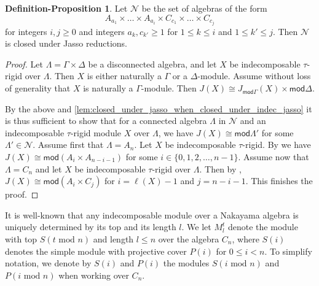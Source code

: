 \documentclass[11pt]{amsart}
\newcommand{\mods}{\mathsf{mod}}
\theoremstyle{definition}
\newtheorem{definitionproposition}[theorem]{Definition-Proposition}
\begin{document}
\begin{definitionproposition}
    
   Let $\mathcal{N}$ be the set of algebras of the form \[A_{a_1} \times \dots \times A_{a_i} \times C_{c_1} \times \dots \times C_{c_j}\] for integers $ i,j \geq 0$ and integers $a_k,c_{k'} \geq 1$ for $1 \leq k \leq i$ and $1 \leq k' \leq j$. Then $\mathcal{N}$ is closed under Jasso reductions.

\end{definitionproposition}

\begin{proof}
    Let $\Lambda = \Gamma \times \Delta$ be a disconnected algebra, and let $X$ be indecomposable $\tau$-rigid over $\Lambda$. Then $X$ is either naturally a $\Gamma$ or a $\Delta$-module. Assume without loss of generality that $X$ is naturally a $\Gamma$-module. Then $J(X) \cong J_{\mods \Gamma}(X) \times \mods \Delta$.

    By the above and \cref{lem:closed_under_jasso_when_closed_under_indec_jasso} it is thus sufficient to show that for a connected algebra $\Lambda$ in $\mathcal{N}$ and an indecomposable $\tau$-rigid module $X$ over $\Lambda$, we have $J(X) \cong \mods \Lambda'$ for some $\Lambda' \in \mathcal{N}$. Assume first that $\Lambda = A_n$. Let $X$ be indecomposable $\tau$-rigid. By \cite[Lem. 2]{MustafaObaid2013} we have $J(X) \cong \mods(A_{i} \times A_{n-i-1})$ for some $i \in \{0,1,2,\dots,n-1\}$. Assume now that $\Lambda = C_n$ and let $X$ be indecomposable $\tau$-rigid over $\Lambda$. Then by \cite[Prop 6.5]{Msapato2022}, $J(X) \cong \mods( A_i \times C_j)$ for $i = \ell(X)-1$ and $j = n-i-1$. This finishes the proof.
\end{proof}

It is well-known that any indecomposable module over a Nakayama algebra is uniquely determined by its top and its length $l$. We let $M^t_l$ denote the module with top $S(t \text{ mod } n)$ and length $l \leq n$ over the algebra $C_n$, where $S(i)$ denotes the simple module with projective cover $P(i)$ for $0 \leq i < n$. To simplify notation, we denote by $S(i)$ and $P(i)$ the modules $S(i \text{ mod } n)$ and $P(i\text{ mod }  n)$ when working over $C_n$.
\end{document}
